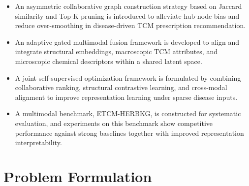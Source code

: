 \documentclass[a4paper,fleqn]{cas-dc}
\begin{document}
\begin{itemize}
\item An asymmetric collaborative graph construction strategy based on Jaccard similarity and Top-K pruning is introduced to alleviate hub-node bias and reduce over-smoothing in disease-driven TCM prescription recommendation.
\item An adaptive gated multimodal fusion framework is developed to align and integrate structural embeddings, macroscopic TCM attributes, and microscopic chemical descriptors within a shared latent space.
\item A joint self-supervised optimization framework is formulated by combining collaborative ranking, structural contrastive learning, and cross-modal alignment to improve representation learning under sparse disease inputs.
\item A multimodal benchmark, ETCM-HERBKG, is constructed for systematic evaluation, and experiments on this benchmark show competitive performance against strong baselines together with improved representation interpretability.
\end{itemize}






\section{Problem Formulation}\label{sec:problem_formulation}
\end{document}
